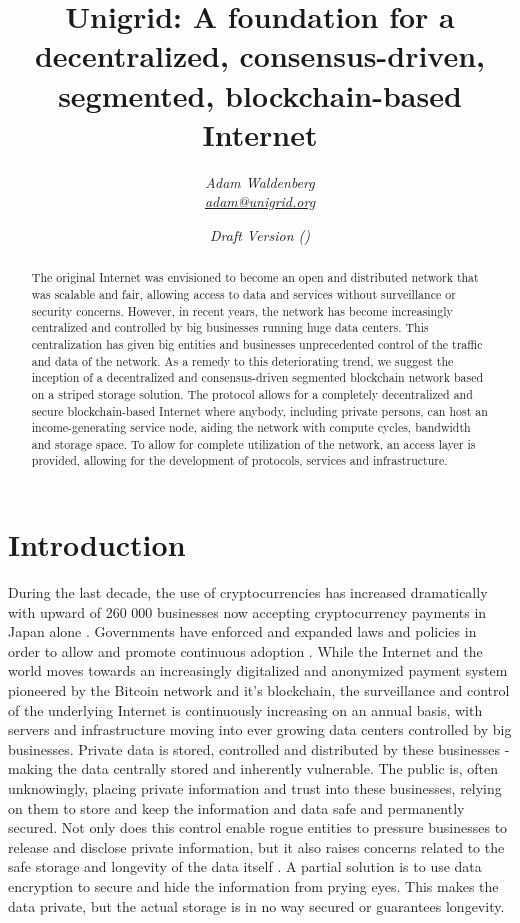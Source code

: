 \documentclass[10pt,a4paper,final]{article}
\author{\textit{Adam Waldenberg\\\href{mailto:adam@unigrid.org}{adam@unigrid.org}}}
\affil{The Unigrid Foundation\\\href{http://www.unigrid.org}{www.unigrid.org}}
\title{Unigrid: A foundation for a decentralized, consensus-driven, segmented, blockchain-based Internet}
\date{\emph{Draft Version \gitRel\hspace{5pt}(\gitCommitterDate)}}
\begin{document}
\maketitle

\begin{abstract}
\noindent The original Internet was envisioned to become an open and distributed network that was scalable and fair, allowing access to data and services without surveillance or security concerns. However, in recent years, the network has become increasingly centralized and controlled by big businesses running huge data centers. This centralization has given big entities and businesses unprecedented control of the traffic and data of the network.
As a remedy to this deteriorating trend, we suggest the inception of a decentralized and consensus-driven segmented blockchain network based on a striped storage solution. The protocol allows for a completely decentralized and secure blockchain-based Internet where anybody, including private persons, can host an income-generating service node, aiding the network with compute cycles, bandwidth and storage space. To allow for complete utilization of the network, an access layer is provided, allowing for the development of protocols, services and infrastructure.
\end{abstract}

\section{Introduction}
During the last decade, the use of cryptocurrencies has increased dramatically with upward of 260 000 businesses now accepting cryptocurrency payments in Japan alone \cite{53companies2018}. Governments have enforced and expanded laws and policies in order to allow and promote continuous adoption \cite{japan2017}. While the Internet and the world moves towards an increasingly digitalized \cite{ekrona2019} and anonymized payment system pioneered by the Bitcoin network \cite{bitcoin2008} and it's blockchain, the surveillance and control of the underlying Internet is continuously increasing on an annual basis, with servers and infrastructure moving into ever growing data centers controlled by big businesses. Private data is stored, controlled and distributed by these businesses - making the data centrally stored and inherently vulnerable. The public is, often unknowingly, placing private information and trust into these businesses, relying on them to store and keep the information and data safe and permanently secured. Not only does this control enable rogue entities to pressure businesses to release and disclose private information, but it also raises concerns related to the safe storage and longevity of the data itself \cite{guardian2017,facebook2018}. A partial solution is to use data encryption to secure and hide the information from prying eyes. This makes the data private, but the actual storage is in no way secured or guarantees longevity.
\end{document}
